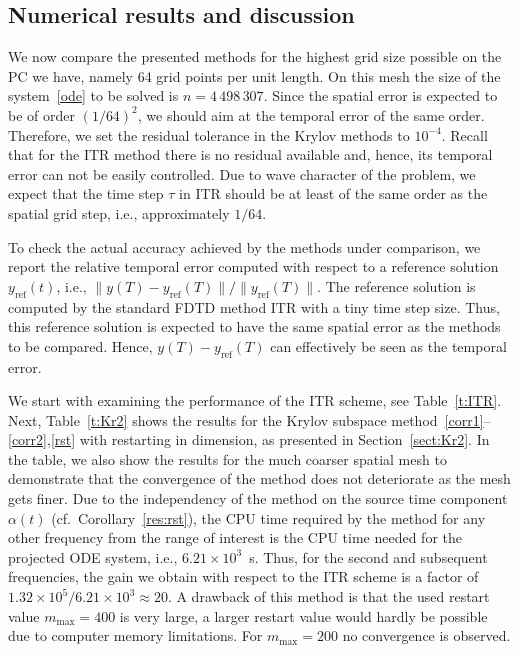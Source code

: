 \documentclass[11pt]{elsarticle}
\newcommand{\e}[1]{\times 10^{#1}}
\begin{document}
\subsection{Numerical results and discussion}
We now compare the presented methods for the highest 
grid size possible on the PC we have, namely 64 grid points
per unit length.  On this mesh the size of the system~\eqref{ode} to
be solved is $n=4\,498\,307$.  Since the spatial error is expected
to be of order $(1/64)^2$, we should aim at the temporal error of
the same order.  Therefore, we set the residual tolerance in the
Krylov methods to $10^{-4}$.  Recall that for the ITR method there is no 
residual
available and, hence, its temporal error can not be easily controlled.
Due to wave character of the problem, we expect that the time step 
$\tau$ in ITR should be at least of the same order as the spatial grid step,
i.e., approximately $1/64$.  

To check the actual accuracy achieved
by the methods under comparison, we report the relative temporal error
computed with respect to a reference solution $y_{\text{ref}}(t)$, i.e.,
$\|y(T)-y_{\text{ref}}(T)\|/\|y_{\text{ref}}(T)\|$.  The reference
solution is computed by the standard FDTD method ITR with a tiny
time step size.  Thus, this reference solution is expected to
have the same spatial error as the methods to be compared.
Hence, $y(T)-y_{\text{ref}}(T)$ can effectively be seen as the temporal 
error.

We start with examining the performance of the ITR scheme,
see Table~\ref{t:ITR}.  Next, Table~\ref{t:Kr2} shows
the results for the Krylov subspace 
method~\eqref{corr1}--\eqref{corr2},\eqref{rst}
with restarting in dimension, as presented in Section~\ref{sect:Kr2}.
In the table, we also show the results for the much
coarser spatial mesh to demonstrate that the convergence
of the method does not deteriorate as the mesh gets
finer.  Due to the independency of the method on the
source time component $\alpha(t)$ (cf.~Corollary~\ref{res:rst}), 
the CPU time required by the method for any other frequency
from the range of interest is the CPU time needed for the
projected ODE system, i.e., $6.21 \e{3}$~s.
Thus, for the second and subsequent frequencies, 
the gain we obtain with respect to the ITR scheme is
a factor of $1.32 \e{5} /6.21 \e{3}\approx 20$.
A drawback of this method is that the used restart value $m_{\max}=400$ is 
very large, a larger restart value would hardly be
possible due to computer memory limitations.  For 
$m_{\max}=200$ no convergence is observed.
\end{document}
